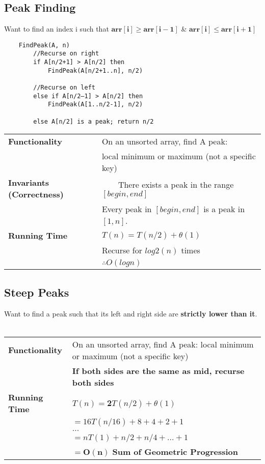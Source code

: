 \documentclass{article}
\newcommand{\tabitem}{~~\llap{\textbullet}~~}
\begin{document}
    \pagebreak

    \subsection{Peak Finding}

    Want to find an index i such that $\bm{arr[i] \geq arr[i-1]}$ \&  $\bm{arr[i] \leq arr[i+1]}$

    \begin{verbatim}
    FindPeak(A, n)
        //Recurse on right
        if A[n/2+1] > A[n/2] then
            FindPeak(A[n/2+1..n], n/2)

        //Recurse on left
        else if A[n/2–1] > A[n/2] then
            FindPeak(A[1..n/2‐1], n/2)

        else A[n/2] is a peak; return n/2

    \end{verbatim}
    
    \begin{tabular}{ll}
        \toprule
        \textbf{Functionality} & On an unsorted array, find A peak: \\
        & local minimum or maximum (not a specific key)\\
        \midrule
        \textbf{Invariants (Correctness)} & \tabitem There exists a peak in the range $[begin, end]$\\
        & Every peak in $[begin, end]$ is a peak in $[1, n]$.\\
        \midrule
        \textbf{Running Time} & $T(n) = T(n/2) + \theta(1)$\\
        & Recurse for $log2(n)$ times\\
        & $\therefore O(logn)$\\
        \bottomrule
    \end{tabular}

    \subsection{Steep Peaks}

    Want to find a peak such that its left and right side are \textbf{strictly lower than it}.\\\\

    \begin{tabular}{ll}
        \toprule
        \textbf{Functionality} & On an unsorted array, find A peak: local minimum or maximum (not a specific key)\\
        & \textbf{If both sides are the same as mid, recurse both sides}\\
        \midrule
        \textbf{Running Time} & $T(n) = $\textbf{2}$T(n/2) + \theta(1)$\\
        & $ = 16T(n/16) + 8  + 4 + 2 + 1$\\
        & $...$\\
        & $ = nT(1) + n/2 + n/4 + ... + 1$ \\
        & $\bm{ = O(n)}$ \textbf{Sum of Geometric Progression}\\
        \bottomrule
    \end{tabular}
\end{document}
